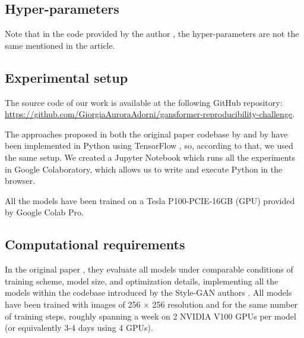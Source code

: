 \documentclass{article}
\begin{document}
	\subsection{Hyper-parameters}
	
	Note that in the code provided by the author \cite{hudson2021generative}, the hyper-parameters are 
	not the same mentioned in the article. 
	
	\subsection{Experimental setup}	
	The source code of our work is available at the following GitHub repository: 
	\url{https://github.com/GiorgiaAuroraAdorni/gansformer-reproducibility-challenge}.
	 
	 The approaches proposed in both the original paper codebase by \citet{karras2020analyzing} and 
	 by \citet{hudson2021generative} have been implemented in Python using TensorFlow 
	 \cite{tensorflow2015-whitepaper}, so, according to that, we used the same setup.
	 We created a Jupyter Notebook which runs all the experiments in Google Colaboratory, which 
	 allows us to write and execute Python in the browser. %
	
	 All the models have been trained on a Tesla P100-PCIE-16GB (GPU) provided by Google 
	 Colab Pro.
	
	\subsection{Computational requirements}
	In the original paper \cite{hudson2021generative}, they evaluate all models under comparable 
	conditions of training scheme, model size, and optimization details, implementing all the models 
	within the codebase introduced by the Style-GAN authors \cite{karras2020analyzing}. 
	All models have been trained with images of 256 × 256 resolution and for the 
	same number of training steps, roughly spanning a week on 2 NVIDIA V100 GPUs per model (or 
	equivalently 3-4 days using 4 GPUs). 
	
\end{document}
